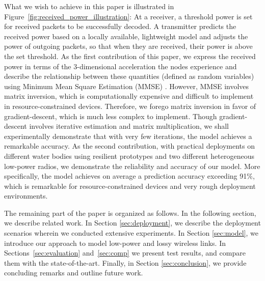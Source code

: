 What we wish to achieve in this paper is illustrated in Figure~\ref{fig:received_power_illustration}: At a receiver, a threshold power is set for received packets to be successfully decoded. A transmitter predicts the received power based on a locally available, lightweight model and adjusts the power of outgoing packets, so that when they are received, their power is above the set threshold. As the first contribution of this paper, we express the received power in terms of the 3-dimensional acceleration the nodes experience and describe the relationship between these quantities (defined as random variables) using Minimum Mean Square Estimation (MMSE) \cite{papoulis2002probability}. However, MMSE involves matrix inversion, which is computationally expensive and difficult to implement in resource-constrained devices. Therefore, we forego matrix inversion in favor of gradient-descent, which is much less complex to implement. Though gradient-descent involves iterative estimation and matrix multiplication, we shall experimentally demonstrate that with very few iterations, the model achieves a remarkable accuracy. As the second contribution, with practical deployments on different water bodies using resilient prototypes and two different heterogeneous low-power radios, we demonstrate the reliability and accuracy of our model. More specifically, the model achieves on average a prediction accuracy exceeding 91\%, which is remarkable for resource-constrained devices and very rough deployment environments. 

The remaining part of the paper is organized as follows. In the following section, we describe related work. In Section \ref{sec:deployment}, we describe the deployment scenarios wherein we conducted extensive experiments. In Section \ref{sec:model}, we introduce our approach to model low-power and lossy wireless links. In Sections~\ref{sec:evaluation} and~\ref{sec:comp} we present test results, and compare them with the state-of-the-art. Finally, in Section \ref{sec:conclusion}, we provide concluding remarks and outline future work.   

